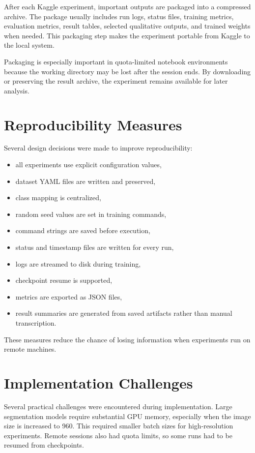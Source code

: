After each Kaggle experiment, important outputs are packaged into a compressed archive. The package usually includes run logs, status files, training metrics, evaluation metrics, result tables, selected qualitative outputs, and trained weights when needed. This packaging step makes the experiment portable from Kaggle to the local system.

Packaging is especially important in quota-limited notebook environments because the working directory may be lost after the session ends. By downloading or preserving the result archive, the experiment remains available for later analysis.

\section{Reproducibility Measures}

Several design decisions were made to improve reproducibility:

\begin{itemize}
    \item all experiments use explicit configuration values,
    \item dataset YAML files are written and preserved,
    \item class mapping is centralized,
    \item random seed values are set in training commands,
    \item command strings are saved before execution,
    \item status and timestamp files are written for every run,
    \item logs are streamed to disk during training,
    \item checkpoint resume is supported,
    \item metrics are exported as JSON files,
    \item result summaries are generated from saved artifacts rather than manual transcription.
\end{itemize}

These measures reduce the chance of losing information when experiments run on remote machines.

\section{Implementation Challenges}

Several practical challenges were encountered during implementation. Large segmentation models require substantial GPU memory, especially when the image size is increased to 960. This required smaller batch sizes for high-resolution experiments. Remote sessions also had quota limits, so some runs had to be resumed from checkpoints.

